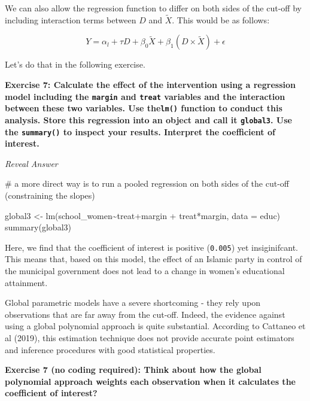 \documentclass[
  letterpaper,
  DIV=11,
  numbers=noendperiod]{scrreprt}
\newenvironment{Shaded}{\begin{snugshade}}{\end{snugshade}}
\newcommand{\AttributeTok}[1]{\textcolor[rgb]{0.40,0.45,0.13}{#1}}
\newcommand{\CommentTok}[1]{\textcolor[rgb]{0.37,0.37,0.37}{#1}}
\newcommand{\FunctionTok}[1]{\textcolor[rgb]{0.28,0.35,0.67}{#1}}
\newcommand{\NormalTok}[1]{\textcolor[rgb]{0.00,0.23,0.31}{#1}}
\newcommand{\OtherTok}[1]{\textcolor[rgb]{0.00,0.23,0.31}{#1}}
\newcommand{\SpecialCharTok}[1]{\textcolor[rgb]{0.37,0.37,0.37}{#1}}
\begin{document}
\hfill\break

We can also allow the regression function to differ on both sides of the
cut-off by including interaction terms between \(D\) and \(\tilde{X}\).
This would be as follows:

\[Y = \alpha_l + \tau D + \beta_0\tilde{X} + \beta_1 (D \times\tilde{X})+ \epsilon\]

Let's do that in the following exercise.

\textbf{Exercise 7: Calculate the effect of the intervention using a
regression model including the \texttt{margin} and \texttt{treat}
variables and the interaction between these two variables. Use
the\texttt{lm()} function to conduct this analysis. Store this
regression into an object and call it \texttt{global3}. Use the
\texttt{summary()} to inspect your results. Interpret the coefficient of
interest.}

\hfill\break

\emph{Reveal Answer}

\begin{Shaded}
\begin{Highlighting}[]
\CommentTok{\# a more direct way is to run a pooled regression on both sides of the cut{-}off (constraining the slopes)}

\NormalTok{global3 }\OtherTok{\textless{}{-}} \FunctionTok{lm}\NormalTok{(school\_women}\SpecialCharTok{\textasciitilde{}}\NormalTok{treat}\SpecialCharTok{+}\NormalTok{margin }\SpecialCharTok{+}\NormalTok{ treat}\SpecialCharTok{*}\NormalTok{margin, }\AttributeTok{data =}\NormalTok{ educ)}
\FunctionTok{summary}\NormalTok{(global3)}
\end{Highlighting}
\end{Shaded}

Here, we find that the coefficient of interest is positive
(\texttt{0.005}) yet insiginifcant. This means that, based on this
model, the effect of an Islamic party in control of the municipal
government does not lead to a change in women's educational attainment.

\hfill\break

Global parametric models have a severe shortcoming - they rely upon
observations that are far away from the cut-off. Indeed, the evidence
against using a global polynomial approach is quite substantial.
According to Cattaneo et al (2019), this estimation technique does not
provide accurate point estimators and inference procedures with good
statistical properties.

\textbf{Exercise 7 (no coding required): Think about how the global
polynomial approach weights each observation when it calculates the
coefficient of interest?}
\end{document}
